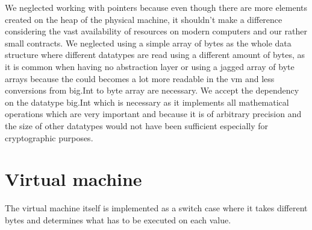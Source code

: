 We neglected working with pointers because even though there are more elements created on the heap of the physical machine, it shouldn't make a difference considering the vast availability of resources on modern computers and our rather small contracts. We neglected using a simple array of bytes as the whole data structure where different datatypes are read using a different amount of bytes, as it is common when having no abstraction layer or using a jagged array of byte arrays because the could becomes a lot more readable in the vm and less conversions from big.Int to byte array are necessary. We accept the dependency on the datatype big.Int which is necessary as it implements all mathematical operations which are very important and because it is of arbitrary precision and the size of other datatypes would not have been sufficient especially for cryptographic purposes.

\section{Virtual machine}
The virtual machine itself is implemented as a switch case where it takes different bytes and determines what has to be executed on each value.

